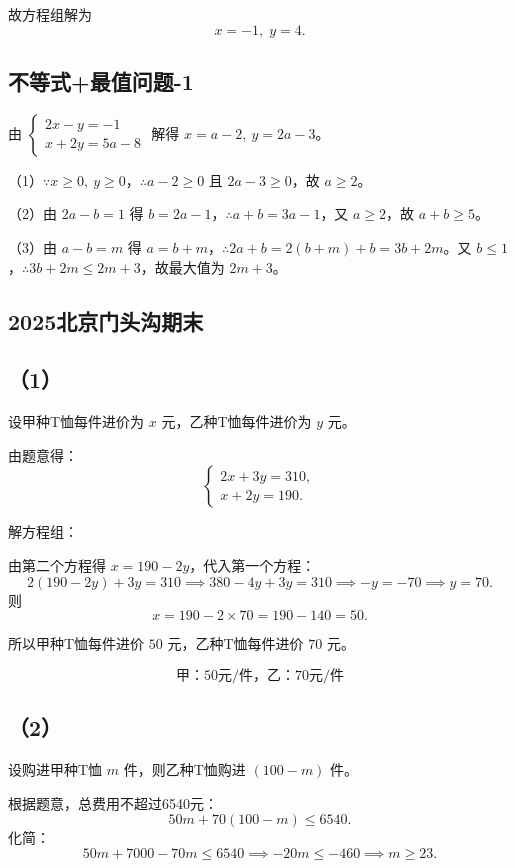 故方程组解为
\[
\boxed{x=-1,\; y=4}.
\]

\subsection{不等式+最值问题-1}
\label{不等式+最值问题-1}
由 \(\begin{cases}2x-y=-1\\x+2y=5a-8\end{cases}\) 解得 \(x=a-2,\ y=2a-3\)。

（1）\(\because x\ge0,\ y\ge0\)，\(\therefore a-2\ge0\) 且 \(2a-3\ge0\)，故 \(\boxed{a\ge2}\)。

（2）由 \(2a-b=1\) 得 \(b=2a-1\)，\(\therefore a+b=3a-1\)，又 \(a\ge2\)，故 \(\boxed{a+b\ge5}\)。

（3）由 \(a-b=m\) 得 \(a=b+m\)，\(\therefore 2a+b=2(b+m)+b=3b+2m\)。又 \(b\le1\)，\(\therefore 3b+2m\le 2m+3\)，故最大值为 \(\boxed{2m+3}\)。


\subsection{2025北京门头沟期末}
\label{2025北京门头沟期末}
\subsection*{（1）}

设甲种T恤每件进价为 \(x\) 元，乙种T恤每件进价为 \(y\) 元。

由题意得：
\[
\begin{cases}
2x + 3y = 310, \\
x + 2y = 190.
\end{cases}
\]

解方程组：

由第二个方程得 \(x = 190 - 2y\)，代入第一个方程：
\[
2(190 - 2y) + 3y = 310 \implies 380 - 4y + 3y = 310 \implies -y = -70 \implies y = 70.
\]
则
\[
x = 190 - 2 \times 70 = 190 - 140 = 50.
\]

所以甲种T恤每件进价 \(50\) 元，乙种T恤每件进价 \(70\) 元。

\[
\boxed{\text{甲：50元/件，乙：70元/件}}
\]

\subsection*{（2）}

设购进甲种T恤 \(m\) 件，则乙种T恤购进 \((100-m)\) 件。

根据题意，总费用不超过6540元：
\[
50m + 70(100-m) \le 6540.
\]
化简：
\[
50m + 7000 - 70m \le 6540 \implies -20m \le -460 \implies m \ge 23.
\]

